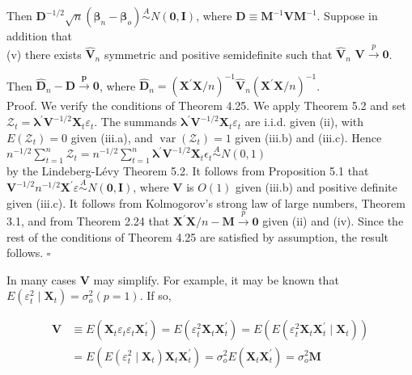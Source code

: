 \documentclass[10pt]{article}
\begin{document}
Then $\mathbf{D}^{-1 / 2} \sqrt{n}\left(\hat{\boldsymbol{\beta}}_{n}-\boldsymbol{\beta}_{o}\right) \stackrel{A}{\sim} N(\mathbf{0}, \mathbf{I})$, where $\mathbf{D} \equiv \mathbf{M}^{-1} \mathbf{V M}^{-1}$. Suppose in addition that\\
(v) there exists $\hat{\mathbf{V}}_{n}$ symmetric and positive semidefinite such that $\hat{\mathbf{V}}_{n}$ $\mathbf{V} \xrightarrow{p} \mathbf{0}$.

Then $\hat{\mathbf{D}}_{n}-\mathbf{D} \xrightarrow{\boldsymbol{p}} \mathbf{0}$, where $\hat{\mathbf{D}}_{n}=\left(\mathbf{X}^{\prime} \mathbf{X} / n\right)^{-1} \hat{\mathbf{V}}_{n}\left(\mathbf{X}^{\prime} \mathbf{X} / n\right)^{-1}$.\\
Proof. We verify the conditions of Theorem 4.25. We apply Theorem 5.2 and set $\mathcal{Z}_{t}=\boldsymbol{\lambda}^{\prime} \mathbf{V}^{-1 / 2} \mathbf{X}_{t} \varepsilon_{t}$. The summands $\boldsymbol{\lambda}^{\prime} \mathbf{V}^{-1 / 2} \mathbf{X}_{t} \varepsilon_{t}$ are i.i.d. given (ii), with $E\left(\mathcal{Z}_{t}\right)=0$ given (iii.a), and $\operatorname{var}\left(\mathcal{Z}_{t}\right)=1$ given (iii.b) and (iii.c). Hence $n^{-1 / 2} \sum_{t=1}^{n} \mathcal{Z}_{t}=n^{-1 / 2} \sum_{t=1}^{n} \boldsymbol{\lambda}^{\prime} \mathbf{V}^{-1 / 2} \mathbf{X}_{t} \epsilon_{t} \stackrel{A}{\sim} N(0,1)$\\
by the Lindeberg-Lévy Theorem 5.2. It follows from Proposition 5.1 that $\mathbf{V}^{-1 / 2} n^{-1 / 2} \mathbf{X}^{\prime} \varepsilon \stackrel{A}{\sim} N(\mathbf{0}, \mathbf{I})$, where $\mathbf{V}$ is $O(1)$ given (iii.b) and positive definite given (iii.c). It follows from Kolmogorov's strong law of large numbers, Theorem 3.1, and from Theorem 2.24 that $\mathbf{X}^{\prime} \mathbf{X} / n-\mathbf{M} \xrightarrow{p} \mathbf{0}$ given (ii) and (iv). Since the rest of the conditions of Theorem 4.25 are satisfied by assumption, the result follows. \(\square\)

In many cases $\mathbf{V}$ may simplify. For example, it may be known that $E\left(\varepsilon_{t}^{2} \mid \mathbf{X}_{t}\right)=\sigma_{o}^{2}(p=1)$. If so,

$$
\begin{aligned}
\mathbf{V} & \equiv E\left(\mathbf{X}_{t} \varepsilon_{t} \varepsilon_{t} \mathbf{X}_{t}^{\prime}\right)=E\left(\varepsilon_{t}^{2} \mathbf{X}_{t} \mathbf{X}_{t}^{\prime}\right)=E\left(E\left(\varepsilon_{t}^{2} \mathbf{X}_{t} \mathbf{X}_{t}^{\prime} \mid \mathbf{X}_{t}\right)\right) \\
& =E\left(E\left(\varepsilon_{t}^{2} \mid \mathbf{X}_{t}\right) \mathbf{X}_{t} \mathbf{X}_{t}^{\prime}\right)=\sigma_{o}^{2} E\left(\mathbf{X}_{t} \mathbf{X}_{t}^{\prime}\right)=\sigma_{o}^{2} \mathbf{M}
\end{aligned}
$$
\end{document}
